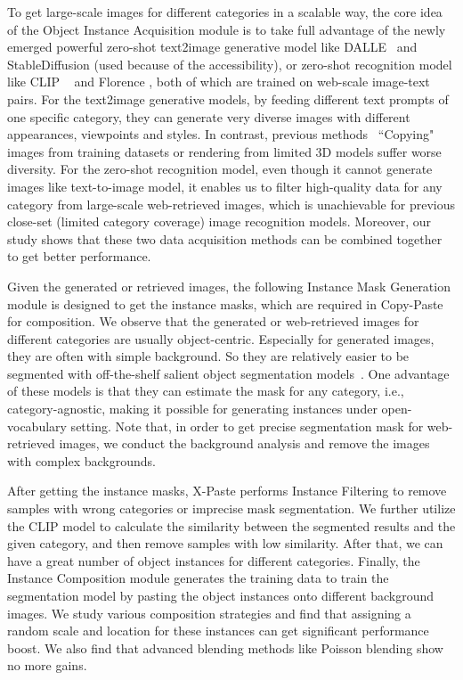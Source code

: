 \documentclass{article}
\begin{document}
To get large-scale images for different categories in a scalable way, the core idea of the Object Instance Acquisition module is to take full advantage of the newly emerged powerful zero-shot text2image generative model like DALLE~\cite{dalle2} and StableDiffusion\cite{ldm} (used because of the accessibility),  or zero-shot recognition model like CLIP ~\cite{CLIP} and Florence \cite{yuan2021florence}, both of which are trained on web-scale image-text pairs. For the text2image generative models, by feeding different text prompts of one specific category, they can generate very diverse images with different appearances, viewpoints and styles. In contrast, previous methods~\cite{Copy-Paste, Simple-Copy-Paste, Contextual-Copy-Paste} ``Copying" images from training datasets or rendering from limited 3D models suffer worse diversity. For the zero-shot recognition model, even though it cannot generate images like text-to-image model, it enables us to filter high-quality data for any category from large-scale web-retrieved images, which is unachievable for previous close-set (limited category coverage) image recognition models. Moreover, our study shows that these two data acquisition methods can be combined together to get better performance.


Given the generated or retrieved images, the following Instance Mask Generation module is designed to get the instance masks, which are required in Copy-Paste for composition. We observe that the generated or web-retrieved images for different categories are usually object-centric. Especially for generated images, they are often with simple background. So they are relatively easier to be segmented with off-the-shelf salient object segmentation models~\cite{U2Net, selfreformer,UFO}. One advantage of these models is that  they can estimate the mask for any category, i.e., category-agnostic, making it possible for generating instances under open-vocabulary setting. Note that, in order to get precise segmentation mask for web-retrieved images, we conduct the background analysis and remove the images with complex backgrounds.

After getting the instance masks, X-Paste performs Instance Filtering to remove samples with wrong categories or imprecise mask segmentation. We further utilize the CLIP model to calculate the similarity between the segmented results and the given category, and then remove samples with low similarity. After that, we can have a great number of object instances for different categories.  
Finally, the Instance Composition module generates the training data to train the segmentation model by pasting the object instances onto different background images. We study various composition strategies and find that assigning a random scale and location for these instances can get significant performance boost. We also find that advanced blending methods like Poisson blending show no more gains.
\end{document}
